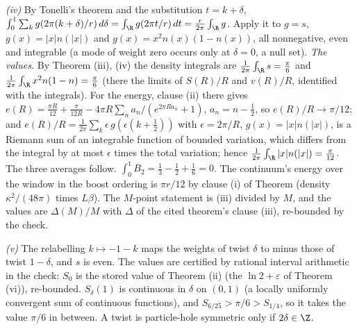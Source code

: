 \emph{(iv)} By Tonelli's theorem and the substitution $t = k + \delta$, $\int_{0}^{1}\sum_{k}g(2\pi(k + \delta)/r)\,d\delta = \int_{\R}g(2\pi t/r)\,dt = \tfrac{r}{2\pi}\int_{\R}g$. Apply it to $g = s$, $g(x) = |x|n(|x|)$ and $g(x) = x^{2}n(x)(1 - n(x))$, all nonnegative, even and integrable (a mode of weight zero occurs only at $\delta = 0$, a null set). \emph{The values.} By Theorem (iii), (iv) the density integrals are $\tfrac{1}{2\pi}\int_{\R}s = \tfrac{\pi}{6}$ and $\tfrac{1}{2\pi}\int_{\R}x^{2}n(1 - n) = \tfrac{\pi}{6}$ (there the limits of $S(R)/R$ and $v(R)/R$, identified with the integrals). For the energy, clause (ii) there gives $e(R) = \tfrac{\pi R}{12} + \tfrac{\pi}{12R} - 4\pi R\sum_{n}a_{n}/(e^{2\pi Ra_{n}} + 1)$, $a_{n} = n - \tfrac12$, so $e(R)/R \to \pi/12$; and $e(R)/R = \tfrac{1}{2\pi}\sum_{k}\epsilon\,g(\epsilon(k + \tfrac12))$ with $\epsilon = 2\pi/R$, $g(x) = |x|n(|x|)$, is a Riemann sum of an integrable function of bounded variation, which differs from the integral by at most $\epsilon$ times the total variation; hence $\tfrac{1}{2\pi}\int_{\R}|x|n(|x|) = \tfrac{\pi}{12}$. The three averages follow. $\int_{0}^{1}B_{2} = \tfrac13 - \tfrac12 + \tfrac16 = 0$. The continuum's energy over the window in the boost ordering is $\pi r/12$ by clause (i) of Theorem  (density $\kappa^{2}/(48\pi)$ times $L\beta$). The $M$-point statement is (iii) divided by $M$, and the values are $\Delta(M)/M$ with $\Delta$ of the cited theorem's clause (iii), re-bounded by the check.

\emph{(v)} The relabelling $k \mapsto -1 - k$ maps the weights of twist $\delta$ to minus those of twist $1 - \delta$, and $s$ is even. The values are certified by rational interval arithmetic in the check: $S_{0}$ is the stored value of Theorem (ii) (the $\ln 2 + \varepsilon$ of Theorem (vi)), re-bounded. $S_{\delta}(1)$ is continuous in $\delta$ on $(0, 1)$ (a locally uniformly convergent sum of continuous functions), and $S_{6/25} > \pi/6 > S_{1/4}$, so it takes the value $\pi/6$ in between. A twist is particle-hole symmetric only if $2\delta \in \Z$.

